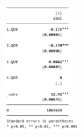 \documentclass[12pt, a4paper, showtrims]{article}
\begin{document}
\begin{justify}
\begin{table}[h!]
    \label{table:1}
    \end{table}




\begin{figure}
    \centering
    \includegraphics[width=0.25\textwidth]{dummy_var_1_2.png}
\end{figure}

     
\end{justify}
\end{document}

